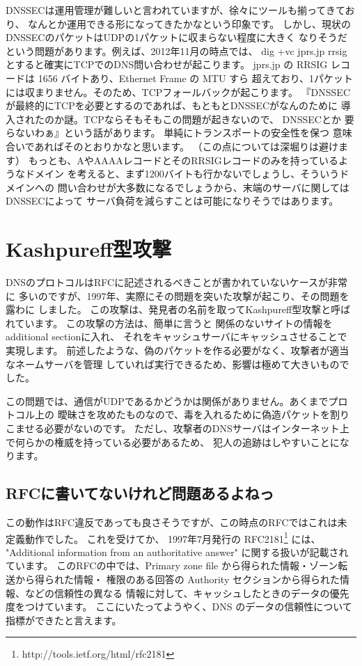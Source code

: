 DNSSECは運用管理が難しいと言われていますが、徐々にツールも揃ってきており、
なんとか運用できる形になってきたかなという印象です。
しかし、現状のDNSSECのパケットはUDPの1パケットに収まらない程度に大きく
なりそうだという問題があります。例えば、2012年11月の時点では、 dig +vc jprs.jp rrsig 
とすると確実にTCPでのDNS問い合わせが起こります。
jprs.jp の RRSIG レコードは 1656 バイトあり、Ethernet Frame の MTU すら
超えており、1パケットには収まりません。そのため、TCPフォールバックが起こります。
『DNSSECが最終的にTCPを必要とするのであれば、もともとDNSSECがなんのために
導入されたのか謎。TCPならそもそもこの問題が起きないので、 DNSSECとか
要らないわぁ』という話があります。 単純にトランスポートの安全性を保つ
意味合いであればそのとおりかなと思います。
（この点については深堀りは避けます）
もっとも、AやAAAAレコードとそのRRSIGレコードのみを持っているようなドメイン
を考えると、まず1200バイトも行かないでしょうし、そういうドメインへの
問い合わせが大多数になるでしょうから、末端のサーバに関してはDNSSECによって
サーバ負荷を減らすことは可能になりそうではあります。


\section{Kashpureff型攻撃}
DNSのプロトコルはRFCに記述されるべきことが書かれていないケースが非常に
多いのですが、1997年、実際にその問題を突いた攻撃が起こり、その問題を露わに
しました。
この攻撃は、発見者の名前を取ってKashpureff型攻撃と呼ばれています。
この攻撃の方法は、簡単に言うと 関係のないサイトの情報をadditional sectionに入れ、
それをキャッシュサーバにキャッシュさせることで実現します。
前述したような、偽のパケットを作る必要がなく、攻撃者が適当なネームサーバを管理
していれば実行できるため、影響は極めて大きいものでした。

この問題では、通信がUDPであるかどうかは関係がありません。あくまでプロトコル上の
曖昧さを攻めたものなので、毒を入れるために偽造パケットを割りこませる必要がないのです。
ただし、攻撃者のDNSサーバはインターネット上で何らかの権威を持っている必要があるため、
犯人の追跡はしやすいことになります。

\subsection{RFCに書いてないけれど問題あるよねっ}
この動作はRFC違反であっても良さそうですが、この時点のRFCではこれは未定義動作でした。
これを受けてか、 1997年7月発行の RFC2181\footnote{http://tools.ietf.org/html/rfc2181} には、
"Additional information from an authoritative answer" に関する扱いが記載されています。
このRFCの中では、Primary zone file から得られた情報・ゾーン転送から得られた情報・
権限のある回答の Authority セクションから得られた情報、などの信頼性の異なる
情報に対して、キャッシュしたときのデータの優先度をつけています。
ここにいたってようやく、DNS のデータの信頼性について指標ができたと言えます。


